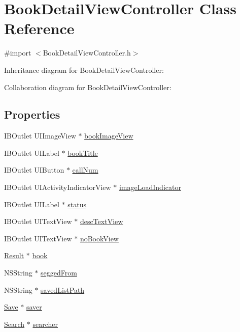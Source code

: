 \hypertarget{interface_book_detail_view_controller}{}\section{Book\+Detail\+View\+Controller Class Reference}
\label{interface_book_detail_view_controller}


{\ttfamily \#import $<$Book\+Detail\+View\+Controller.\+h$>$}



Inheritance diagram for Book\+Detail\+View\+Controller\+:


Collaboration diagram for Book\+Detail\+View\+Controller\+:
\subsection*{Properties}
\begin{DoxyCompactItemize}
\item 
I\+B\+Outlet U\+I\+Image\+View $\ast$ \hyperlink{interface_book_detail_view_controller_abc652edd9ccc4d9fcfb4509549ebbcca}{book\+Image\+View}
\item 
I\+B\+Outlet U\+I\+Label $\ast$ \hyperlink{interface_book_detail_view_controller_a8f8b751361cea806a31f828fd3b395a2}{book\+Title}
\item 
I\+B\+Outlet U\+I\+Button $\ast$ \hyperlink{interface_book_detail_view_controller_aaf51d427a091cbbc8d56a583aae4c67f}{call\+Num}
\item 
I\+B\+Outlet U\+I\+Activity\+Indicator\+View $\ast$ \hyperlink{interface_book_detail_view_controller_ae94c1e164a8be1c581349ed211421f18}{image\+Load\+Indicator}
\item 
I\+B\+Outlet U\+I\+Label $\ast$ \hyperlink{interface_book_detail_view_controller_a7a734fdbd38ad55ff9dd7a1eac4f7851}{status}
\item 
I\+B\+Outlet U\+I\+Text\+View $\ast$ \hyperlink{interface_book_detail_view_controller_a5041896b84e981aff8352686c6d163af}{desc\+Text\+View}
\item 
I\+B\+Outlet U\+I\+Text\+View $\ast$ \hyperlink{interface_book_detail_view_controller_a97334f844c3562b73bafd253a50ba060}{no\+Book\+View}
\item 
\hyperlink{interface_result}{Result} $\ast$ \hyperlink{interface_book_detail_view_controller_afcef6fbafb9b021381b32df9a13d0b51}{book}
\item 
N\+S\+String $\ast$ \hyperlink{interface_book_detail_view_controller_abd428e31e5786f92a707845b65f8307c}{segged\+From}
\item 
N\+S\+String $\ast$ \hyperlink{interface_book_detail_view_controller_ab7004065d69e9415b54a4d8fb09669ec}{saved\+List\+Path}
\item 
\hyperlink{interface_save}{Save} $\ast$ \hyperlink{interface_book_detail_view_controller_ac3455e9a6270af9f460694ec241af5ae}{saver}
\item 
\hyperlink{interface_search}{Search} $\ast$ \hyperlink{interface_book_detail_view_controller_af7ab497759e614df06f71b732931a6ac}{searcher}
\end{DoxyCompactItemize}


